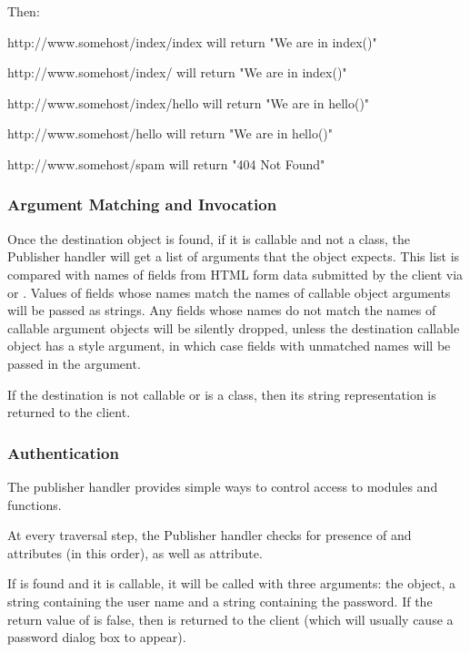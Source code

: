 Then:

http://www.somehost/index/index will return "We are in index()"

http://www.somehost/index/ will return "We are in index()"

http://www.somehost/index/hello will return "We are in hello()"

http://www.somehost/hello will return "We are in hello()"

http://www.somehost/spam will return "404 Not Found"

\subsubsection{Argument Matching and Invocation\label{hand-pub-alg-args}}

Once the destination object is found, if it is callable and not a
class, the Publisher handler will get a list of arguments that the
object expects. This list is compared with names of fields from HTML
form data submitted by the client via  or
. Values of fields whose names match the names of callable
object arguments will be passed as strings. Any fields whose names do
not match the names of callable argument objects will be silently dropped,
unless the destination callable object has a  style
argument, in which case fields with unmatched names will be passed in the
 argument.

If the destination is not callable or is a class, then its string
representation is returned to the client.

\subsubsection{Authentication\label{hand-pub-alg-auth}}

The publisher handler provides simple ways to control access to
modules and functions.

At every traversal step, the Publisher handler checks for presence of
 and  attributes (in this order), as 
well as  attribute. 

If  is found and it is callable, it will be called
with three arguments: the  object, a string containing
the user name and a string containing the password. If the return
value of
 is false, then  is
returned to the client (which will usually cause a password dialog box
to appear).

